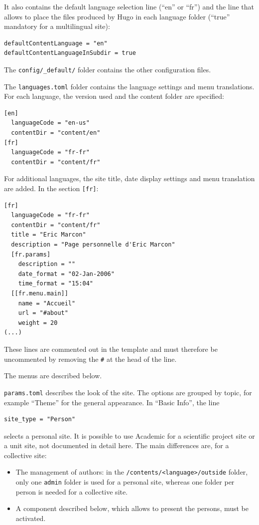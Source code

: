 \documentclass[
  12pt,
  american,
  a4paper,
  extrafontsizes,onecolumn,openright
  ]{memoir}
\providecommand{\tightlist}{%
  \setlength{\itemsep}{0pt}\setlength{\parskip}{0pt}}
\begin{document}
It also contains the default language selection line (\enquote{en} or \enquote{fr}) and the line that allows to place the files produced by Hugo in each language folder (\enquote{true} mandatory for a multilingual site):

\begin{verbatim}
defaultContentLanguage = "en"
defaultContentLanguageInSubdir = true
\end{verbatim}

The \texttt{config/\_default/} folder contains the other configuration files.

The \texttt{languages.toml} folder contains the language settings and menu translations.
For each language, the version used and the content folder are specified:

\begin{verbatim}
[en]
  languageCode = "en-us"
  contentDir = "content/en"
[fr]
  languageCode = "fr-fr"
  contentDir = "content/fr"
\end{verbatim}

For additional languages, the site title, date display settings and menu translation are added.
In the section \texttt{{[}fr{]}}:

\begin{verbatim}
[fr]
  languageCode = "fr-fr"
  contentDir = "content/fr"
  title = "Eric Marcon"
  description = "Page personnelle d'Eric Marcon"
  [fr.params]
    description = ""
    date_format = "02-Jan-2006"
    time_format = "15:04"
  [[fr.menu.main]]
    name = "Accueil"
    url = "#about"
    weight = 20
(...)
\end{verbatim}

These lines are commented out in the template and must therefore be uncommented by removing the \texttt{\#} at the head of the line.

The menus are described below.

\texttt{params.toml} describes the look of the site.
The options are grouped by topic, for example \enquote{Theme} for the general appearance.
In \enquote{Basic Info}, the line

\begin{verbatim}
site_type = "Person"
\end{verbatim}

selects a personal site.
It is possible to use Academic for a scientific project site or a unit site, not documented in detail here.
The main differences are, for a collective site:

\begin{itemize}
\tightlist
\item
  The management of authors: in the \texttt{/contents/\textless{}language\textgreater{}/outside} folder, only one \texttt{admin} folder is used for a personal site, whereas one folder per person is needed for a collective site.
\item
  A component described below, which allows to present the persons, must be activated.
\end{itemize}
\end{document}
